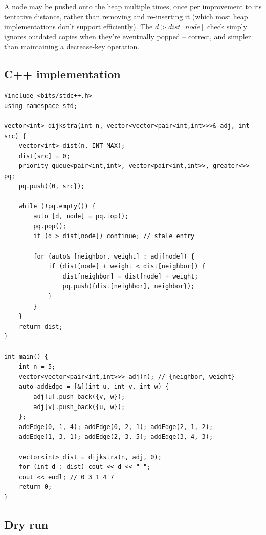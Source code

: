 \begin{ideabox}
A node may be pushed onto the heap multiple times, once per
improvement to its tentative distance, rather than removing and
re-inserting it (which most heap implementations don't support
efficiently). The $\textit{d} > \textit{dist}[\textit{node}]$ check
simply ignores outdated copies when they're eventually popped --
correct, and simpler than maintaining a decrease-key operation.
\end{ideabox}

\subsection*{C++ implementation}

\begin{lstlisting}
#include <bits/stdc++.h>
using namespace std;

vector<int> dijkstra(int n, vector<vector<pair<int,int>>>& adj, int src) {
    vector<int> dist(n, INT_MAX);
    dist[src] = 0;
    priority_queue<pair<int,int>, vector<pair<int,int>>, greater<>> pq;
    pq.push({0, src});

    while (!pq.empty()) {
        auto [d, node] = pq.top();
        pq.pop();
        if (d > dist[node]) continue; // stale entry

        for (auto& [neighbor, weight] : adj[node]) {
            if (dist[node] + weight < dist[neighbor]) {
                dist[neighbor] = dist[node] + weight;
                pq.push({dist[neighbor], neighbor});
            }
        }
    }
    return dist;
}

int main() {
    int n = 5;
    vector<vector<pair<int,int>>> adj(n); // {neighbor, weight}
    auto addEdge = [&](int u, int v, int w) {
        adj[u].push_back({v, w});
        adj[v].push_back({u, w});
    };
    addEdge(0, 1, 4); addEdge(0, 2, 1); addEdge(2, 1, 2);
    addEdge(1, 3, 1); addEdge(2, 3, 5); addEdge(3, 4, 3);

    vector<int> dist = dijkstra(n, adj, 0);
    for (int d : dist) cout << d << " ";
    cout << endl; // 0 3 1 4 7
    return 0;
}
\end{lstlisting}

\subsection*{Dry run}


